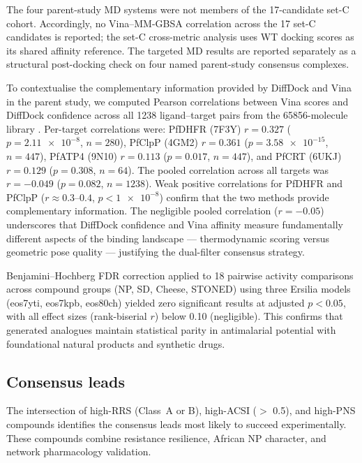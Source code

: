 \documentclass[11pt,a4paper]{article}
\begin{document}
The four parent-study MD systems were not members of the 17-candidate set-C cohort. Accordingly, no Vina--MM-GBSA correlation across the 17 set-C candidates is reported; the set-C cross-metric analysis uses WT docking scores as its shared affinity reference. The targeted MD results are reported separately as a structural post-docking check on four named parent-study consensus complexes.

To contextualise the complementary information provided by DiffDock and Vina in the parent study, we computed Pearson correlations between Vina scores and DiffDock confidence across all \num{1238} ligand--target pairs from the \num{65856}-molecule library \citep{temgoua2026antimalarial}. Per-target correlations were: PfDHFR (7F3Y) $r = \num{0.327}$ ($p = \num{2.11e-8}$, $n = \num{280}$), PfClpP (4GM2) $r = \num{0.361}$ ($p = \num{3.58e-15}$, $n = \num{447}$), PfATP4 (9N10) $r = \num{0.113}$ ($p = \num{0.017}$, $n = \num{447}$), and PfCRT (6UKJ) $r = \num{0.129}$ ($p = \num{0.308}$, $n = \num{64}$). The pooled correlation across all targets was $r = \num{-0.049}$ ($p = \num{0.082}$, $n = \num{1238}$). Weak positive correlations for PfDHFR and PfClpP ($r \approx \num{0.3}$--$\num{0.4}$, $p < \num{1e-8}$) confirm that the two methods provide complementary information. The negligible pooled correlation ($r = \num{-0.05}$) underscores that DiffDock confidence and Vina affinity measure fundamentally different aspects of the binding landscape --- thermodynamic scoring versus geometric pose quality --- justifying the dual-filter consensus strategy.

Benjamini--Hochberg FDR correction applied to \num{18} pairwise activity comparisons across compound groups (NP, SD, Cheese, STONED) using three Ersilia models (eos7yti, eos7kpb, eos80ch) yielded zero significant results at adjusted $p < \num{0.05}$, with all effect sizes (rank-biserial $r$) below \num{0.10} (negligible). This confirms that generated analogues maintain statistical parity in antimalarial potential with foundational natural products and synthetic drugs.

\subsection{Consensus leads}

The intersection of high-RRS (Class~A or B), high-ACSI ($>$ 0.5), and high-PNS compounds identifies the consensus leads most likely to succeed experimentally. These compounds combine resistance resilience, African NP character, and network pharmacology validation.
\end{document}
